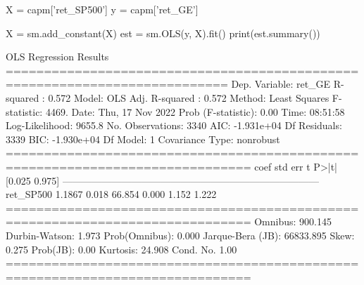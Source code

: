 \begin{ipython}
X = capm['ret_SP500']
y = capm['ret_GE']
	
X = sm.add_constant(X)
est = sm.OLS(y, X).fit()
print(est.summary())
\end{ipython}
\begin{ioutput}
OLS Regression Results                                
===========================================================================
Dep. Variable:                 ret_GE   R-squared :                   0.572
Model:                            OLS   Adj. R-squared :              0.572
Method:                 Least Squares   F-statistic:                  4469.
Date:                Thu, 17 Nov 2022   Prob (F-statistic):            0.00
Time:                        08:51:58   Log-Likelihood:              9655.8
No. Observations:                3340   AIC:                     -1.931e+04
Df Residuals:                    3339   BIC:                     -1.930e+04
Df Model:                           1                                                  
Covariance Type:            nonrobust                                                  
==============================================================================
coef    std err          t      P>|t|      [0.025      0.975]
------------------------------------------------------------------------------
ret_SP500      1.1867      0.018     66.854      0.000       1.152       1.222
==============================================================================
Omnibus:                      900.145   Durbin-Watson:                   1.973
Prob(Omnibus):                  0.000   Jarque-Bera (JB):            66833.895
Skew:                           0.275   Prob(JB):                         0.00
Kurtosis:                      24.908   Cond. No.                         1.00
==============================================================================
\end{ioutput}

